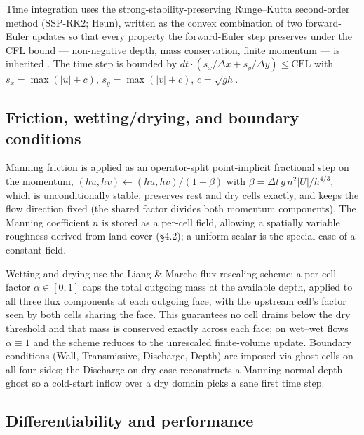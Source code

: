 Time integration uses the strong-stability-preserving Runge--Kutta
second-order method (SSP-RK2; Heun), written as the convex combination
of two forward-Euler updates so that every property the forward-Euler
step preserves under the CFL bound --- non-negative depth, mass
conservation, finite momentum --- is inherited \citep{Toro2009}. The
time step is bounded by
\(dt \cdot (s_x/\Delta x + s_y/\Delta y) \leq \text{CFL}\) with
\(s_x = \max(|u| + c)\), \(s_y = \max(|v| + c)\), \(c = \sqrt{g h}\).

\subsection{Friction, wetting/drying, and boundary
conditions}

Manning friction is applied as an operator-split point-implicit
fractional step on the momentum,
\((hu, hv) \leftarrow (hu, hv)/(1 + \beta)\) with
\(\beta = \Delta t\, g\, n^2 |U| / h^{4/3}\), which is unconditionally
stable, preserves rest and dry cells exactly, and keeps the flow
direction fixed (the shared factor divides both momentum components).
The Manning coefficient \(n\) is stored as a per-cell field, allowing a
spatially variable roughness derived from land cover (§4.2); a uniform
scalar is the special case of a constant field.

Wetting and drying use the Liang \& Marche flux-rescaling scheme: a
per-cell factor \(\alpha \in [0, 1]\) caps the total outgoing mass at
the available depth, applied to all three flux components at each
outgoing face, with the upstream cell's factor seen by both cells
sharing the face. This guarantees no cell drains below the dry threshold
and that mass is conserved exactly across each face; on wet--wet flows
\(\alpha ≡ 1\) and the scheme reduces to the unrescaled finite-volume
update. Boundary conditions (Wall, Transmissive, Discharge, Depth) are
imposed via ghost cells on all four sides; the Discharge-on-dry case
reconstructs a Manning-normal-depth ghost so a cold-start inflow over a
dry domain picks a sane first time step.

\subsection{Differentiability and
performance}

